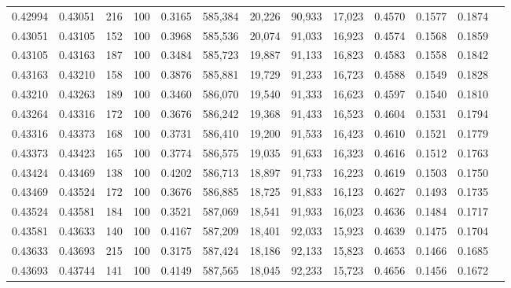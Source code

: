\begin{tabular}{rrrrrrrrrrrrr}
0.42994 & 0.43051 &   216 & 100 &                                     0.3165 & 585,384 &  20,226 &  90,933 &  17,023 & 0.4570 & 0.1577 & 0.1874 \\
0.43051 & 0.43105 &   152 & 100 &                                     0.3968 & 585,536 &  20,074 &  91,033 &  16,923 & 0.4574 & 0.1568 & 0.1859 \\
0.43105 & 0.43163 &   187 & 100 &                                     0.3484 & 585,723 &  19,887 &  91,133 &  16,823 & 0.4583 & 0.1558 & 0.1842 \\
0.43163 & 0.43210 &   158 & 100 &                                     0.3876 & 585,881 &  19,729 &  91,233 &  16,723 & 0.4588 & 0.1549 & 0.1828 \\
0.43210 & 0.43263 &   189 & 100 &                                     0.3460 & 586,070 &  19,540 &  91,333 &  16,623 & 0.4597 & 0.1540 & 0.1810 \\
0.43264 & 0.43316 &   172 & 100 &                                     0.3676 & 586,242 &  19,368 &  91,433 &  16,523 & 0.4604 & 0.1531 & 0.1794 \\
0.43316 & 0.43373 &   168 & 100 &                                     0.3731 & 586,410 &  19,200 &  91,533 &  16,423 & 0.4610 & 0.1521 & 0.1779 \\
0.43373 & 0.43423 &   165 & 100 &                                     0.3774 & 586,575 &  19,035 &  91,633 &  16,323 & 0.4616 & 0.1512 & 0.1763 \\
0.43424 & 0.43469 &   138 & 100 &                                     0.4202 & 586,713 &  18,897 &  91,733 &  16,223 & 0.4619 & 0.1503 & 0.1750 \\
0.43469 & 0.43524 &   172 & 100 &                                     0.3676 & 586,885 &  18,725 &  91,833 &  16,123 & 0.4627 & 0.1493 & 0.1735 \\
0.43524 & 0.43581 &   184 & 100 &                                     0.3521 & 587,069 &  18,541 &  91,933 &  16,023 & 0.4636 & 0.1484 & 0.1717 \\
0.43581 & 0.43633 &   140 & 100 &                                     0.4167 & 587,209 &  18,401 &  92,033 &  15,923 & 0.4639 & 0.1475 & 0.1704 \\
0.43633 & 0.43693 &   215 & 100 &                                     0.3175 & 587,424 &  18,186 &  92,133 &  15,823 & 0.4653 & 0.1466 & 0.1685 \\
0.43693 & 0.43744 &   141 & 100 &                                     0.4149 & 587,565 &  18,045 &  92,233 &  15,723 & 0.4656 & 0.1456 & 0.1672 \\

\end{tabular}
